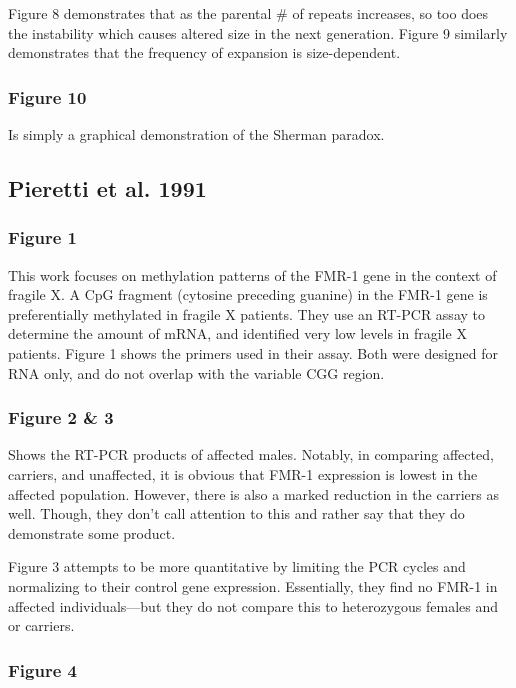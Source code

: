 Figure 8 demonstrates that as the parental \# of repeats increases, so too does the instability which causes altered size in the next generation. Figure 9 similarly demonstrates that the frequency of expansion is size-dependent. 

\subsubsection*{Figure 10}

Is simply a graphical demonstration of the Sherman paradox. 


\subsection*{Pieretti et al. 1991}

\subsubsection*{Figure 1}

This work focuses on methylation patterns of the FMR-1 gene in the context of fragile X. A CpG fragment (cytosine preceding guanine) in the FMR-1 gene is preferentially methylated in fragile X patients. They use an RT-PCR assay to determine the amount of mRNA, and identified very low levels in fragile X patients. Figure 1 shows the primers used in their assay. Both were designed for RNA only, and do not overlap with the variable CGG region. 

\subsubsection*{Figure 2 \& 3}

Shows the RT-PCR products of affected males. Notably, in comparing affected, carriers, and unaffected, it is obvious that FMR-1 expression is lowest in the affected population. However, there is also a marked reduction in the carriers as well. Though, they don't call attention to this and rather say that they do demonstrate some product.\newline

Figure 3 attempts to be more quantitative by limiting the PCR cycles and normalizing to their control gene expression. Essentially, they find no FMR-1 in affected individuals---but they do not compare this to heterozygous females and or carriers. 

\subsubsection*{Figure 4}

